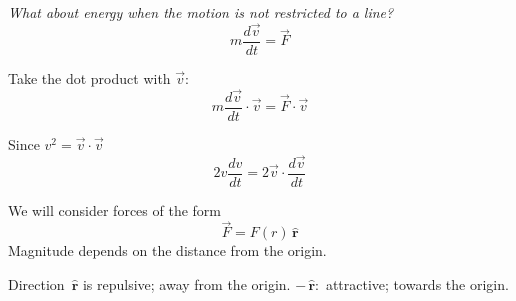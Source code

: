 \documentclass[twoside]{scrartcl}
\let\oldhat\hat
\renewcommand{\hat}[1]{\,\oldhat{\boldsymbol{\mathbf{#1}}}}
\begin{document}
\emph{What about energy when the motion is not restricted to a line?}
\[m\frac{d\vec{v}}{dt} = \vec{F}\]

Take the dot product with $\vec{v}$:
\[m\frac{d\vec{v}}{dt}\cdot{\vec{v}} = \vec{F}\cdot\vec{v}\]

Since $v^2 = \vec{v}\cdot\vec{v}$
\[2v\frac{dv}{dt} = 2\vec{v}\cdot\frac{d\vec{v}}{dt}\]









We  will consider forces of the form
\[\vec{F} = F(r)\hat{r}\]
Magnitude depends on the distance from the origin. 

Direction $\hat{r}$ is repulsive; away from the origin. $-\hat{r}:$ attractive; towards the origin.\\ 
\end{document}
